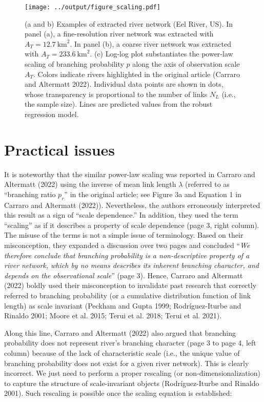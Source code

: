 \documentclass[
  12pt,
]{article}
\begin{document}
\begin{figure}
\centering
\texttt{[image: ../output/figure\_scaling.pdf]}
\caption{\label{fig:fig-pr}(a and b) Examples of extracted river network (Eel River, US). In panel (a), a fine-resolution river network was extracted with \(A_T = 12.7~\text{km}^2\). In panel (b), a coarse river network was extracted with \(A_T = 233.6~\text{km}^2\). (c) Log-log plot substantiates the power-law scaling of branching probability \(p\) along the axis of observation scale \(A_T\). Colors indicate rivers highlighted in the original article (Carraro and Altermatt 2022). Individual data points are shown in dots, whose transparency is proportional to the number of links \(N_L\) (i.e., the sample size). Lines are predicted values from the robust regression model.}
\end{figure}

\hypertarget{practical-issues}{%
\section{Practical issues}\label{practical-issues}}

It is noteworthy that the similar power-law scaling was reported in Carraro and Altermatt (2022) using the inverse of mean link length \(\lambda\) (referred to as ``branching ratio \(p_r\)'' in the original article; see Figure 3a and Equation 1 in Carraro and Altermatt (2022)). Nevertheless, the authors erroneously interpreted this result as a sign of ``scale dependence.'' In addition, they used the term ``scaling'' as if it describes a property of scale dependence (page 3, right column). The misuse of the terms is not a simple issue of terminology. Based on their misconception, they expanded a discussion over two pages and concluded ``\emph{We therefore conclude that branching probability is a non-descriptive property of a river network, which by no means describes its inherent branching character, and depends on the observational scale}'' (page 3). Hence, Carraro and Altermatt (2022) boldly used their misconception to invalidate past research that correctly referred to branching probability (or a cumulative distribution function of link length) as scale invariant (Peckham and Gupta 1999; Rodríguez-Iturbe and Rinaldo 2001; Moore et al. 2015; Terui et al. 2018; Terui et al. 2021).

Along this line, Carraro and Altermatt (2022) also argued that branching probability does not represent river's branching character (page 3 to page 4, left column) because of the lack of characteristic scale (i.e., the unique value of branching probability does not exist for a given river network). This is clearly incorrect. We just need to perform a proper rescaling (or non-dimensionalization) to capture the structure of scale-invariant objects (Rodríguez-Iturbe and Rinaldo 2001). Such rescaling is possible once the scaling equation is established:
\end{document}
